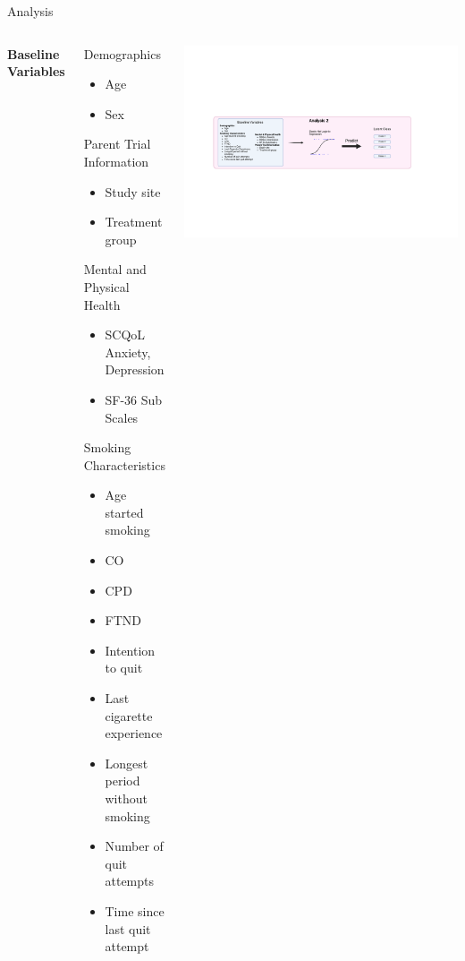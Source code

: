 \documentclass[aspectratio=169]{beamer}
\begin{document}
\begin{frame}{Analysis}
	\begin{columns}
		\textbf{Baseline Variables} \\
		\vspace{2mm}
		\begin{tiny}
			Demographics
			\begin{itemize}
				\item Age
				\item Sex
			\end{itemize}
			Parent Trial Information
			\begin{itemize}
				\item Study site
				\item Treatment group
			\end{itemize}
			Mental and Physical Health
			\begin{itemize}
				\item SCQoL Anxiety, Depression
				\item SF-36 Sub Scales
			\end{itemize}
			Smoking Characteristics
			\begin{itemize}
				\item Age started smoking
				\item CO
				\item CPD
				\item FTND
				\item Intention to quit
				\item Last cigarette experience
				\item Longest period without smoking
				\item Number of quit attempts
				\item Time since last quit attempt
			\end{itemize}
		\end{tiny}

			\includegraphics[width=\columnwidth]{overview2_limited}
	\end{columns}

\end{frame}
\end{document}
